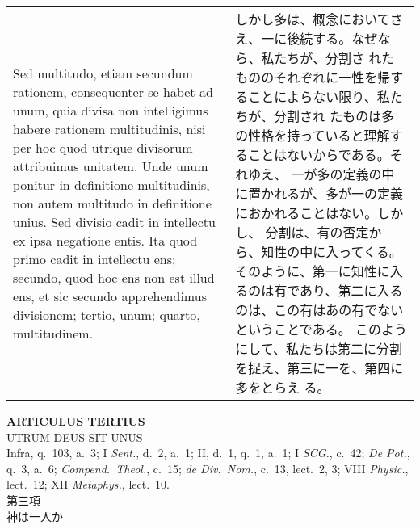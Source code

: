 \documentclass[10pt]{jsarticle} %
\begin{document}
\begin{longtable}{p{21em}p{21em}}
\\

Sed
multitudo, etiam secundum rationem, consequenter se habet ad unum, quia
divisa non intelligimus habere rationem multitudinis, nisi per hoc quod
utrique divisorum attribuimus unitatem. Unde unum ponitur in definitione
multitudinis, non autem multitudo in definitione unius. Sed divisio
cadit in intellectu ex ipsa negatione entis. Ita quod primo cadit in
intellectu ens; secundo, quod hoc ens non est illud ens, et sic secundo
apprehendimus divisionem; tertio, unum; quarto, multitudinem.

&

しかし多は、概念においてさえ、一に後続する。なぜなら、私たちが、分割さ
れたもののそれぞれに一性を帰することによらない限り、私たちが、分割され
たものは多の性格を持っていると理解することはないからである。それゆえ、
一が多の定義の中に置かれるが、多が一の定義におかれることはない。しかし、
分割は、有の否定から、知性の中に入ってくる。そのように、第一に知性に入
るのは有であり、第二に入るのは、この有はあの有でないということである。
このようにして、私たちは第二に分割を捉え、第三に一を、第四に多をとらえ
る。

\end{longtable}



\newpage
{}

\begin{center}
 {\Large {\bf ARTICULUS TERTIUS}}\\
 {\large UTRUM DEUS SIT UNUS}\\
 {\footnotesize Infra, q.~103, a.~3; I {\itshape Sent.}, d.~2, a.~1; II,
 d.~1, q.~1, a.~1; I {\itshape SCG.}, c.~42; {\itshape De Pot.}, q.~3,
 a.~6; {\itshape Compend.~Theol.}, c.~15; {\itshape de Div.~Nom.},
 c.~13, lect.~2, 3; VIII {\itshape Physic.}, lect.~12; XII {\itshape
 Metaphys.}, lect.~10.}\\
 {\Large 第三項\\神は一人か}
\end{center}
\end{document}
